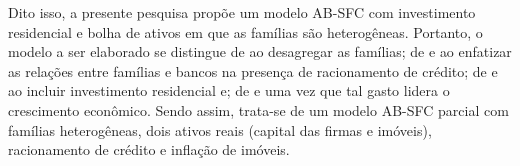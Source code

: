 Dito isso, a presente pesquisa propõe um modelo AB-SFC com investimento residencial e bolha de ativos em que as famílias são heterogêneas.
Portanto, o modelo a ser elaborado se distingue de \textcite{petrini_demanda_2019} ao desagregar as famílias;
de \textcite{dawid_bubbles_2015} e \textcite{caiani_agent_2016} ao enfatizar as relações entre famílias e bancos na presença de racionamento de crédito;
de \textcite{botta_when_2019} e \textcite{carvalho_income_2014} ao incluir investimento residencial e; de \textcite{zezza_u.s._2008} e \textcite{nikolaidi_securitisation_2015} uma vez que tal gasto lidera o crescimento econômico.
Sendo assim, trata-se de um modelo AB-SFC parcial com famílias heterogêneas, dois ativos reais (capital das firmas e imóveis), racionamento de crédito e inflação de imóveis.


